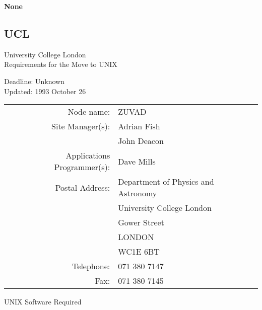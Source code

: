 {\bf None}


\newpage
\subsection{UCL}

\renewcommand{\starsitename}{University College London}
\renewcommand{\starnodename}{ZUVAD}

\renewcommand{\starunixdate}{Unknown}
\renewcommand{\starupdate}{1993 October 26}

\renewcommand{\starsitetelephone}{071 380 7147}
\renewcommand{\starsitefax}{071 380 7145}

\begin{center}
{\Large\sc \starsitename \\ [2ex]
           Requirements for the Move to UNIX}

\vspace{3mm}
{\large\sc Deadline: \starunixdate \\ [1ex]
           Updated: \starupdate}
\end{center}

\vspace{5mm}

\begin{center}
\begin{tabular}{rl}
{\sc Node name:}                  & \starnodename \\
{\sc Site Manager(s):}            & Adrian Fish \\
                                  & John Deacon \\
{\sc Applications Programmer(s):} & Dave Mills \\
{\sc Postal Address:}             & Department of Physics and Astronomy \\
                                  & University College London \\
                                  & Gower Street \\
                                  & LONDON \\
                                  & WC1E 6BT \\
{\sc Telephone:}                  & \starsitetelephone \\
{\sc Fax:}                        & \starsitefax \\
\end{tabular}
\end{center}

\vspace{5mm}
\begin{center}
{\large\sc UNIX Software Required}
\end{center}

